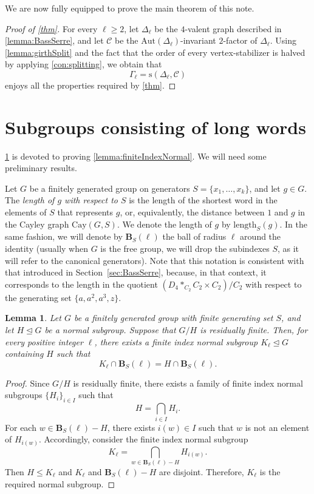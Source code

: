 \documentclass[a4paper]{amsart}
\newcommand{\len}{\mathrm{length}}
\newcommand{\Aut}{\mathrm{Aut}}
\newcommand{\B}{\mathbf{B}}
\newcommand{\0}{\mathbf{0}}
\newtheorem{lemma}[thm]{Lemma}
\theoremstyle{definition}
\begin{document}
We are now fully equipped to prove the main theorem of this note.

\begin{proof}[Proof of \cref{thm}]
    For every $\ell\ge 2$, let $\Delta_\ell$ be the $4$-valent graph described in \cref{lemma:BassSerre}, and let $\mathcal{C}$ be the $\Aut(\Delta_\ell)$-invariant $2$-factor of $\Delta_\ell$. Using \cref{lemma:girthSplit} and the fact that the order of every vertex-stabilizer is halved by applying \cref{con:splitting}, we obtain that
    \[ \Gamma_\ell = \mathrm{s}(\Delta_\ell, \mathcal{C})\]
    enjoys all the properties required by \cref{thm}.
\end{proof}


\section{Subgroups consisting of long words}\label{sec:finiteIndex}
\cref{sec:finiteIndex} is devoted to proving \cref{lemma:finiteIndexNormal}. We will need some preliminary results.

Let $G$ be a finitely generated group on generators $S = \{ x_1, \dots, x_k\}$, and let $g\in G$. The \emph{length of \( g\) with respect to $S$} is the length of the shortest word in the elements of \( S \) that represents \( g \), or, equivalently, the distance between $1$ and $g$ in the Cayley graph $\mathrm{Cay}(G,S)$. We denote the length of $g$ by \(\len_S(g)\). In the same fashion, we will denote by $\B_S(\ell)$ the ball of radius $\ell$ around the identity (usually when $G$ is the free group, we will drop the subindexes $S$, as it will refer to the canonical generators). Note that this notation is consistent with that introduced in Section~\ref{sec:BassSerre}, because, in that context, it corresponds to the length in the quotient $(D_4 *_{C_2} C_2 \times C_2) / C_2$ with respect to the generating set $\{a, a^2, a^3, z \}$.

\begin{lemma}
\label{lem: res fin}
Let $G$ be a finitely generated group with finite generating set $S$, and let $H \unlhd G$ be a normal subgroup. Suppose that $G/H$ is residually finite. Then, for every positive integer $\ell$, there exists a finite index normal subgroup \( K_\ell \trianglelefteq G \) containing \( H \) such that 
\[ K_\ell \cap \B_S(\ell) = H \cap \B_S(\ell).
\]
\end{lemma}
\begin{proof}
Since $G/H$ is residually finite, there exists a family of finite index normal subgroups $\{ H_i \}_{i \in I}$ such that 
\[ H = \bigcap_{i \in I} H_i.\]
For each $w \in \B_S(\ell) - H$, there exists $i(w) \in I$ such that $w$ is not an element of $H_{i(w)}$. Accordingly, consider the finite index normal subgroup 
\[ K_\ell = \bigcap_{w \in \B_{S}(\ell) - H} H_{i(w)}.\]
Then \( H \leq K_\ell \) and $K_\ell$ and $\B_S(\ell) - H$ are disjoint. Therefore, $K_\ell$ is the required normal subgroup.
\end{proof}
\end{document}
